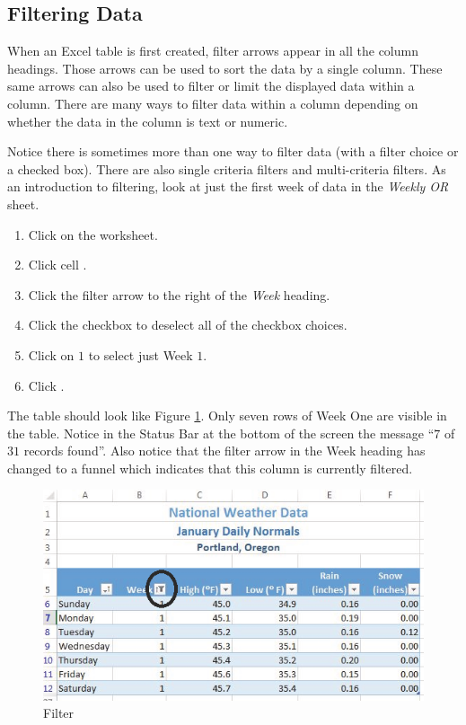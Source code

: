 \subsection{Filtering Data}

When an Excel table is first created, filter arrows appear in all the column headings. Those arrows can be used to sort the data by a single column. These same arrows can also be used to filter or limit the displayed data within a column. There are many ways to filter data within a column depending on whether the data in the column is text or numeric. 

Notice there is sometimes more than one way to filter data (\ie with a filter choice or a checked box). There are also single criteria filters and multi-criteria filters. As an introduction to filtering, look at just the first week of data in the \textit{Weekly OR} sheet.

\begin{enumerate}
	\item Click on the  worksheet.
	\item Click cell .
	\item Click the filter arrow to the right of the \textit{Week} heading.
	\item Click the  checkbox to deselect all of the checkbox choices.
	\item Click on $ 1 $ to select just Week $ 1 $.
	\item Click .
\end{enumerate}

The table should look like Figure \ref{05:fig16}. Only seven rows of Week One are visible in the table. Notice in the Status Bar at the bottom of the screen the message ``$ 7 $ of $ 31 $ records found''. Also notice that the filter arrow in the Week heading has changed to a funnel which indicates that this column is currently filtered.

\begin{figure}[H]
	\centering
	\includegraphics[width=\maxwidth{.95\linewidth}]{gfx/ch05_fig16}
	\caption{Filter}
	\label{05:fig16}
\end{figure}

